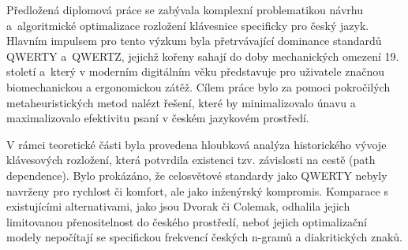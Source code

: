 \documentclass[a4paper, twoside, 12pt, czech]{article}
\begin{document}




Předložená diplomová práce se zabývala komplexní problematikou návrhu a~algoritmické 
optimalizace rozložení klávesnice specificky pro český jazyk. Hlav\-ním impulsem pro 
tento výzkum byla přetrvávající dominance standardů QWER\-TY a~QWERTZ, jejichž kořeny sahají do 
doby mechanických omezení 19. století a~který v moderním digitálním věku představuje 
pro uživatele značnou biomechanickou a ergonomickou zátěž. Cílem práce bylo za 
pomoci pokročilých metaheuristických metod nalézt řešení, které by minimalizovalo 
únavu a maximalizovalo efektivitu psaní v českém jazykovém prostředí.

V rámci teoretické části byla provedena hloubková analýza historického vývoje klávesových 
rozložení, která potvrdila existenci tzv. závislosti na cestě (path dependence). 
Bylo prokázáno, že celosvětové standardy jako QWERTY nebyly navr\-ženy pro rychlost 
či komfort, ale jako inženýrský kompromis. Komparace s existujícími alternativami, 
jako jsou Dvorak či Colemak, odhalila jejich limitovanou přenositelnost do českého 
prostředí, neboť jejich optimalizační modely nepočítají se specifickou frekvencí 
českých n-gramů a diakritických znaků.
\end{document}
